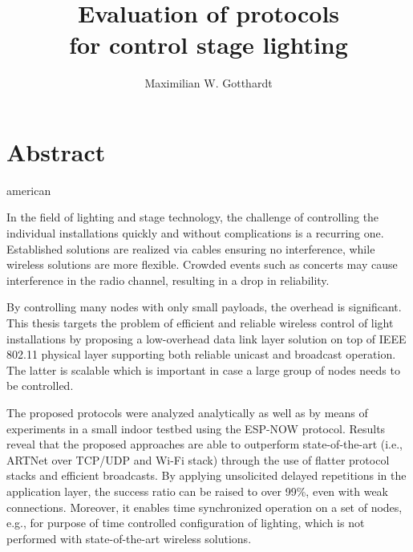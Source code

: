\documentclass[]{ccs-thesis}
\author{Maximilian W. Gotthardt}
\title{Evaluation of protocols \\for control stage lighting}
\begin{document}

\maketitle

\thispagestyle{empty}

\cleardoublepage

\chapter*{Abstract}
\begin{otherlanguage*}{american}


In the field of lighting and stage technology, the challenge of controlling the individual installations 
quickly and without complications is a recurring one.
Established solutions are realized via cables ensuring no interference,
while wireless solutions are more flexible.
Crowded events such as concerts may cause interference in the radio channel, 
resulting in a drop in reliability.

By controlling many nodes with only small payloads, the overhead is significant.
This thesis targets the problem of efficient and reliable wireless control of light installations 
by proposing a low-overhead data link layer solution on top of IEEE 802.11 physical layer
supporting both reliable unicast and broadcast operation.
The latter is scalable which is important in case a large group of nodes needs to be controlled.

The proposed protocols were analyzed analytically 
as well as by means of experiments in a small indoor testbed using the ESP-NOW protocol. 
Results reveal that the proposed approaches are able to outperform state-of-the-art 
(i.e., ARTNet over TCP/UDP and Wi-Fi stack) through the use of flatter protocol stacks and efficient broadcasts.
By applying unsolicited delayed repetitions in the application layer, 
the success ratio can be raised to over 99\%, even with weak connections.
Moreover, it enables time synchronized operation on a set of nodes, e.g., 
for purpose of time controlled configuration of lighting, 
which is not performed with state-of-the-art wireless solutions.

\end{otherlanguage*}
\end{document}
